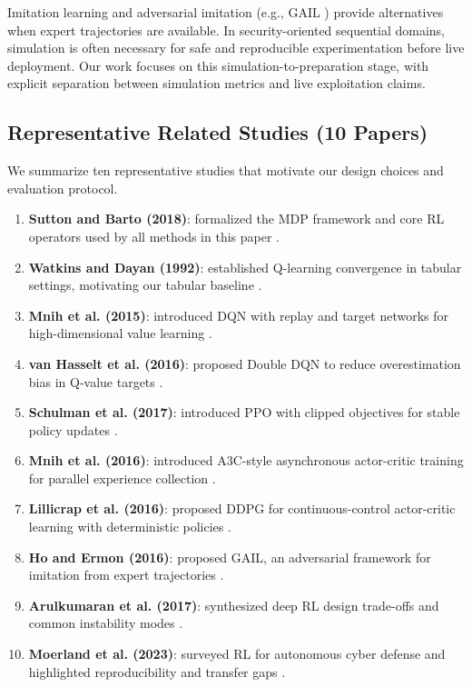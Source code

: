 \documentclass[conference]{IEEEtran}
\begin{document}
Imitation learning and adversarial imitation (e.g., GAIL \cite{ho2016gail}) provide alternatives when expert trajectories are available. In security-oriented sequential domains, simulation is often necessary for safe and reproducible experimentation before live deployment. Our work focuses on this simulation-to-preparation stage, with explicit separation between simulation metrics and live exploitation claims.

\subsection{Representative Related Studies (10 Papers)}
We summarize ten representative studies that motivate our design choices and evaluation protocol.
\begin{enumerate}
    \item \textbf{Sutton and Barto (2018)}: formalized the MDP framework and core RL operators used by all methods in this paper \cite{sutton2018}.
    \item \textbf{Watkins and Dayan (1992)}: established Q-learning convergence in tabular settings, motivating our tabular baseline \cite{watkins1992}.
    \item \textbf{Mnih et al. (2015)}: introduced DQN with replay and target networks for high-dimensional value learning \cite{mnih2015}.
    \item \textbf{van Hasselt et al. (2016)}: proposed Double DQN to reduce overestimation bias in Q-value targets \cite{hasselt2016}.
    \item \textbf{Schulman et al. (2017)}: introduced PPO with clipped objectives for stable policy updates \cite{schulman2017ppo}.
    \item \textbf{Mnih et al. (2016)}: introduced A3C-style asynchronous actor-critic training for parallel experience collection \cite{mnih2016a3c}.
    \item \textbf{Lillicrap et al. (2016)}: proposed DDPG for continuous-control actor-critic learning with deterministic policies \cite{lillicrap2016}.
    \item \textbf{Ho and Ermon (2016)}: proposed GAIL, an adversarial framework for imitation from expert trajectories \cite{ho2016gail}.
    \item \textbf{Arulkumaran et al. (2017)}: synthesized deep RL design trade-offs and common instability modes \cite{arulkumaran2017}.
    \item \textbf{Moerland et al. (2023)}: surveyed RL for autonomous cyber defense and highlighted reproducibility and transfer gaps \cite{moerland2023}.
\end{enumerate}
\end{document}
